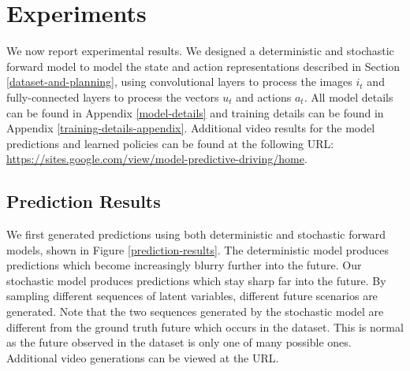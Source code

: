 \documentclass{article} %
\begin{document}
\section{Experiments}
\label{experiments}

We now report experimental results. We designed a deterministic and stochastic forward model to model the state and action representations described in Section \ref{dataset-and-planning}, using convolutional layers to process the images $i_t$ and fully-connected layers to process the vectors $u_t$ and actions $a_t$. All model details can be found in Appendix \ref{model-details} and training details can be found in Appendix \ref{training-details-appendix}.
Additional video results for the model predictions and learned policies can be found at the following URL: \url{https://sites.google.com/view/model-predictive-driving/home}.


    \subsection{Prediction Results}


    We first generated predictions using both deterministic and stochastic forward models, shown in  Figure \ref{prediction-results}.
    The deterministic model produces predictions which become increasingly blurry further into the future. Our stochastic model produces predictions which stay sharp far into the future.
    By sampling different sequences of latent variables, different future scenarios are generated.
    Note that the two sequences generated by the stochastic model are different from the ground truth future which occurs in the dataset.
    This is normal as the future observed in the dataset is only one of many possible ones.
    Additional video generations can be viewed at the URL.
\end{document}
